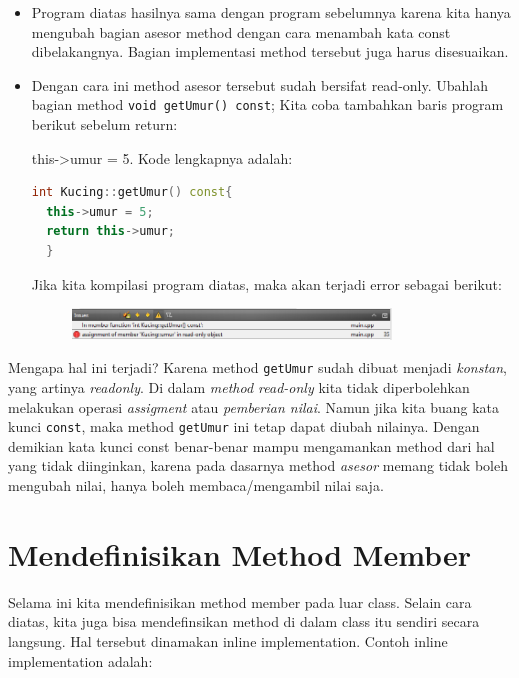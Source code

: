 \begin{itemize}
\item
  Program diatas hasilnya sama dengan program sebelumnya karena kita
  hanya mengubah bagian asesor method dengan cara menambah kata const
  dibelakangnya. Bagian implementasi method tersebut juga harus
  disesuaikan.
\item
  Dengan cara ini method asesor tersebut sudah bersifat read-only.
  Ubahlah bagian method \texttt{void\ getUmur()\ const}; Kita coba
  tambahkan baris program berikut sebelum return:

  this-\textgreater{}umur = 5.
  Kode lengkapnya adalah:
  
  \begin{lstlisting}[language=c++, numbers=none]
  int Kucing::getUmur() const{
  this->umur = 5;
  return this->umur;
  }
  \end{lstlisting}
  
  Jika kita kompilasi program diatas, maka akan terjadi error sebagai
  berikut:
  
  \begin{figure}[htbp]
  	\centering
  	\includegraphics[width=0.8\textwidth]{../manuscript/images/capture6-3.PNG}

  \end{figure}
\end{itemize}



Mengapa hal ini terjadi? Karena method \texttt{getUmur} sudah dibuat
menjadi \emph{konstan}, yang artinya \emph{readonly}. Di dalam
\emph{method read-only} kita tidak diperbolehkan melakukan operasi
\emph{assigment} atau \emph{pemberian nilai}. Namun jika kita buang kata
kunci \texttt{const}, maka method \texttt{getUmur} ini tetap dapat
diubah nilainya. Dengan demikian kata kunci const benar-benar mampu
mengamankan method dari hal yang tidak diinginkan, karena pada dasarnya
method \emph{asesor} memang tidak boleh mengubah nilai, hanya boleh
membaca/mengambil nilai saja.

\section{Mendefinisikan Method
Member}\label{mendefinisikan-method-member}

Selama ini kita mendefinisikan method member pada luar class. Selain
cara diatas, kita juga bisa mendefinsikan method di dalam class itu
sendiri secara langsung. Hal tersebut dinamakan inline implementation.
Contoh inline implementation adalah:

